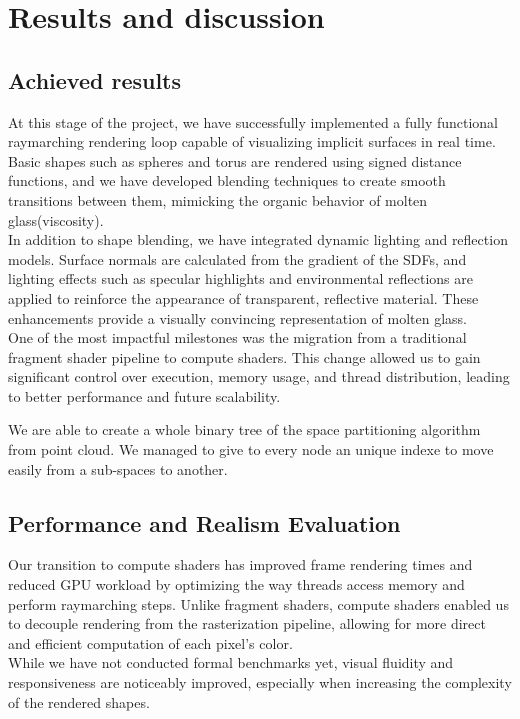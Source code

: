 \documentclass{rapportcs}
\begin{document}
    \newpage
    \section{Results and discussion}
    \subsection{Achieved results}
At this stage of the project, we have successfully implemented a fully functional raymarching rendering loop capable of visualizing implicit surfaces in real time. Basic shapes such as spheres and torus are rendered using signed distance functions, and we have developed blending techniques to create smooth transitions between them, mimicking the organic behavior of molten glass(viscosity).\\

In addition to shape blending, we have integrated dynamic lighting and reflection models. Surface normals are calculated from the gradient of the SDFs, and lighting effects such as specular highlights and environmental reflections are applied to reinforce the appearance of transparent, reflective material. These enhancements provide a visually convincing representation of molten glass.\\

One of the most impactful milestones was the migration from a traditional fragment shader pipeline to compute shaders. This change allowed us to gain significant control over execution, memory usage, and thread distribution, leading to better performance and future scalability.

We are able to create a whole binary tree of the space partitioning algorithm from point cloud. We managed to give to every node an unique indexe to move easily from a sub-spaces to another.

\subsection{Performance and Realism Evaluation}
Our transition to compute shaders has improved frame rendering times and reduced GPU workload by optimizing the way threads access memory and perform raymarching steps. Unlike fragment shaders, compute shaders enabled us to decouple rendering from the rasterization pipeline, allowing for more direct and efficient computation of each pixel's color.\\

While we have not conducted formal benchmarks yet, visual fluidity and responsiveness are noticeably improved, especially when increasing the complexity of the rendered shapes.\\
\end{document}
